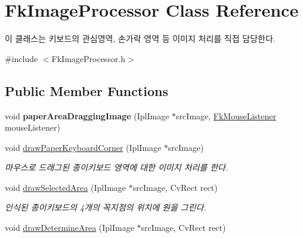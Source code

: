 \hypertarget{class_fk_image_processor}{}\section{Fk\+Image\+Processor Class Reference}
\label{class_fk_image_processor}


이 클래스는 키보드의 관심영역, 손가락 영역 등 이미지 처리를 직접 담당한다.  




{\ttfamily \#include $<$Fk\+Image\+Processor.\+h$>$}

\subsection*{Public Member Functions}
\begin{DoxyCompactItemize}
\item 
\hypertarget{class_fk_image_processor_aa39920d9352ccd390f8b994570828b74}{}void {\bfseries paper\+Area\+Dragging\+Image} (Ipl\+Image $\ast$src\+Image, \hyperlink{class_fk_mouse_listener}{Fk\+Mouse\+Listener} mouse\+Listener)\label{class_fk_image_processor_aa39920d9352ccd390f8b994570828b74}

\item 
\hypertarget{class_fk_image_processor_a0e35204ab5040d4083d3f1dd1efe9d72}{}void \hyperlink{class_fk_image_processor_a0e35204ab5040d4083d3f1dd1efe9d72}{draw\+Paper\+Keyboard\+Corner} (Ipl\+Image $\ast$src\+Image)\label{class_fk_image_processor_a0e35204ab5040d4083d3f1dd1efe9d72}

\begin{DoxyCompactList}\small\item\em 마우스로 드래그된 종이키보드 영역에 대한 이미지 처리를 한다. \end{DoxyCompactList}\item 
\hypertarget{class_fk_image_processor_a847e46b1f4f583ffc2dd2ee64b341986}{}void \hyperlink{class_fk_image_processor_a847e46b1f4f583ffc2dd2ee64b341986}{draw\+Selected\+Area} (Ipl\+Image $\ast$src\+Image, Cv\+Rect rect)\label{class_fk_image_processor_a847e46b1f4f583ffc2dd2ee64b341986}

\begin{DoxyCompactList}\small\item\em 인식된 종이키보드의 4개의 꼭지점의 위치에 원을 그린다. \end{DoxyCompactList}\item 
\hypertarget{class_fk_image_processor_a2dac0f3c27286c6c3555ab9020cddcd3}{}void \hyperlink{class_fk_image_processor_a2dac0f3c27286c6c3555ab9020cddcd3}{draw\+Determine\+Area} (Ipl\+Image $\ast$src\+Image, Cv\+Rect rect)\label{class_fk_image_processor_a2dac0f3c27286c6c3555ab9020cddcd3}


\end{DoxyCompactItemize}
